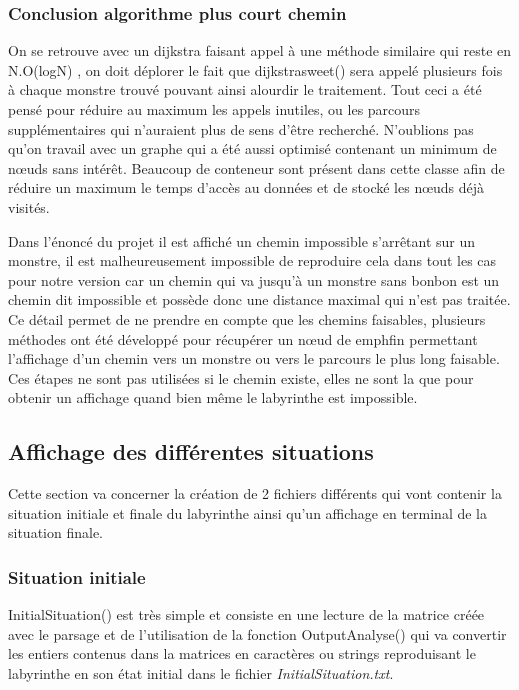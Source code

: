 \documentclass[12pt, oneside]{article}
\begin{document}
\subsubsection{Conclusion algorithme plus court chemin}
On se retrouve avec un dijkstra faisant appel à une méthode similaire qui reste en N.O(logN) , on doit déplorer le fait que dijkstra\textunderscore sweet() sera appelé plusieurs fois à chaque monstre trouvé pouvant ainsi alourdir le traitement. Tout ceci a été pensé pour réduire au maximum les appels inutiles, ou les parcours supplémentaires qui n’auraient plus de sens d’être recherché. N’oublions pas qu’on travail avec un graphe qui a été aussi optimisé contenant un minimum de nœuds sans intérêt. Beaucoup de conteneur sont présent dans cette classe afin de réduire un maximum le temps d’accès au données et de stocké les nœuds déjà visités. 

Dans l’énoncé du projet il est affiché un chemin impossible s’arrêtant sur un monstre, il est malheureusement impossible de reproduire cela dans tout les cas pour notre version car un chemin qui va jusqu’à un monstre sans bonbon est un chemin dit impossible et possède donc une distance maximal qui n’est pas traitée. Ce détail permet de ne prendre en compte que les chemins faisables, plusieurs méthodes ont été développé pour récupérer un nœud de emph{fin} permettant l’affichage d’un chemin vers un monstre ou vers le parcours le plus long faisable. Ces étapes ne sont pas utilisées si le chemin existe, elles ne sont la que pour obtenir un affichage quand bien même le labyrinthe est impossible. 
\subsection{Affichage des différentes situations}
Cette section va concerner la création de 2 fichiers différents qui vont contenir la situation initiale et finale du labyrinthe ainsi qu'un affichage en terminal de la situation finale.

\subsubsection{Situation initiale}
Initial\textunderscore Situation() est très simple et consiste en une lecture de la matrice créée avec le parsage et de l'utilisation de la fonction Output\textunderscore Analyse() qui va convertir les entiers contenus dans la matrices en caractères ou strings reproduisant le labyrinthe en son état initial dans le fichier \emph{InitialSituation.txt}.
\end{document}
